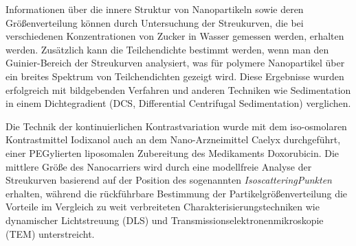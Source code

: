 


Informationen über die innere Struktur von Nanopartikeln sowie deren Größenverteilung können durch Untersuchung der Streukurven, die bei verschiedenen Konzentrationen von Zucker in Wasser gemessen werden, erhalten werden. Zusätzlich kann die Teilchendichte bestimmt werden, wenn man den Guinier-Bereich der Streukurven analysiert, was für polymere Nanopartikel über ein breites Spektrum von Teilchendichten gezeigt wird. Diese Ergebnisse wurden erfolgreich mit bildgebenden Verfahren und anderen Techniken wie Sedimentation in einem Dichtegradient (DCS, Differential Centrifugal Sedimentation) verglichen.

Die Technik der kontinuierlichen Kontrastvariation wurde mit dem iso-osmolaren Kontrastmittel Iodixanol auch an dem Nano-Arzneimittel Caelyx durchgeführt, einer PEGylierten liposomalen Zubereitung des Medikaments Doxorubicin. Die mittlere Größe des Nanocarriers wird durch eine modellfreie Analyse der Streukurven basierend auf der Position des sogenannten \emph{IsoscatteringPunkten} erhalten, während die rückführbare Bestimmung der Partikelgrößenverteilung die Vorteile im Vergleich zu weit verbreiteten Charakterisierungstechniken wie dynamischer Lichtstreuung (DLS) und Transmissionselektronenmikroskopie (TEM) unterstreicht.


